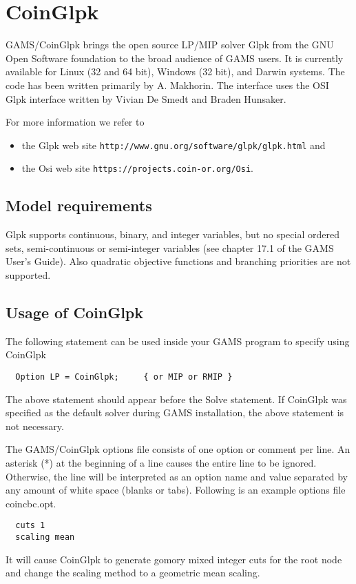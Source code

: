 




\section{CoinGlpk}

GAMS/CoinGlpk brings the open source LP/MIP solver Glpk from the GNU Open Software foundation to the broad audience of GAMS users.
It is currently available for Linux (32 and 64 bit), Windows (32 bit), and Darwin systems.
The code has been written primarily by A. Makhorin.
The interface uses the OSI Glpk interface written by Vivian De Smedt and Braden Hunsaker.

For more information we refer to
\begin{itemize}
\item the Glpk web site \texttt{http://www.gnu.org/software/glpk/glpk.html} and
\item the Osi web site \texttt{https://projects.coin-or.org/Osi}.
\end{itemize}

\subsection{Model requirements}

Glpk supports continuous, binary, and integer variables, but no special ordered sets, semi-continuous or semi-integer variables (see chapter 17.1 of the GAMS User's Guide).
Also quadratic objective functions and branching priorities are not supported.

\subsection{Usage of CoinGlpk}

The following statement can be used inside your GAMS program to specify using CoinGlpk
\begin{verbatim}
  Option LP = CoinGlpk;     { or MIP or RMIP }
\end{verbatim}

The above statement should appear before the Solve statement.
If CoinGlpk was specified as the default solver during GAMS installation, the above statement is not necessary.

The GAMS/CoinGlpk options file consists of one option or comment per line.
An asterisk (*) at the beginning of a line causes the entire line to be ignored.
Otherwise, the line will be interpreted as an option name and value separated by any amount of white space (blanks or tabs).
Following is an example options file coincbc.opt.
\begin{verbatim}
  cuts 1
  scaling mean
\end{verbatim}
It will cause CoinGlpk to generate gomory mixed integer cuts for the root node and change the scaling method to a geometric mean scaling.

